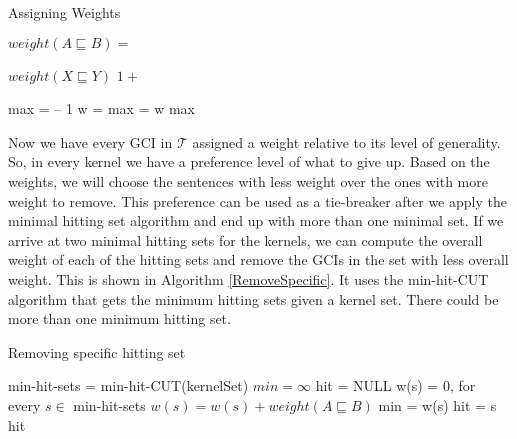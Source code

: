 \begin{algorithm}
\caption{Assigning Weights}
\label{AssignWeights}
\begin{algorithmic}[1]
\State $weight(A \sqsubseteq B) = $ 
\EndFor
\EndFunction
\end{algorithmic}

\begin{algorithmic}[1]
\State
\Return $weight(X \sqsubseteq Y)$
\EndIf
{}
\State
{}
\Else
\State
\Return $1 + $ 
\EndIf
\EndFunction
\end{algorithmic}

\begin{algorithmic}[1]
\State max = -- 1
\State w = 
\State max = w
\EndIf
\EndFor
\State
\Return max
\EndFunction
\end{algorithmic}
\end{algorithm}

Now we have every GCI in $\mathcal{T}$ assigned a weight relative to its level of generality. So, in every kernel we have a preference level of what to give up. Based on the weights, we will choose the sentences with less weight over the ones with more weight to remove. This preference can be used as a tie-breaker after we apply the minimal hitting set algorithm and end up with more than one minimal set. If we arrive at two minimal hitting sets for the kernels, we can compute the overall weight of each of the hitting sets and remove the GCIs in the set with less overall weight. This is shown in Algorithm \ref{RemoveSpecific}. It uses the min-hit-CUT algorithm that gets the minimum hitting sets given a kernel set. There could be more than one minimum hitting set.

\begin{algorithm}
\caption{Removing specific hitting set}
\label{RemoveSpecific}
\begin{algorithmic}[1]
\State min-hit-sets = min-hit-CUT(kernelSet)
\State $min = \infty$
\State hit = NULL
\State w(s) = 0, for every $s \in $ min-hit-sets
\State $w(s) = w(s) + weight(A \sqsubseteq B)$
\EndFor
{}
\State min = w(s)
\State hit = s
\EndIf
\EndFor
\State
\Return hit
\EndFunction
\end{algorithmic}
\end{algorithm}

